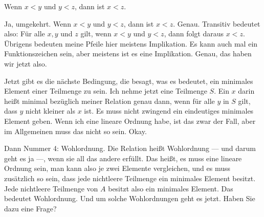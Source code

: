 \begin{student-interaction}[Studentenantwort]
Wenn $x < y$ und $y < z$, dann ist $x < z$.
\end{student-interaction}

\begin{spoken-clean}[continued]
Ja, umgekehrt. Wenn $x < y$ und $y < z$, dann ist $x < z$. Genau. Transitiv bedeutet also: Für alle $x, y$ und $z$ gilt, wenn $x < y$ und $y < z$, dann folgt daraus $x < z$. Übrigens bedeuten meine Pfeile hier meistens Implikation. Es kann auch mal ein Funktionszeichen sein, aber meistens ist es eine Implikation. Genau, das haben wir jetzt also.

Jetzt gibt es die nächste Bedingung, die besagt, was es bedeutet, ein minimales Element einer Teilmenge zu sein. Ich nehme jetzt eine Teilmenge $S$. Ein $x$ darin heißt minimal bezüglich meiner Relation genau dann, wenn für alle $y$ in $S$ gilt, dass $y$ nicht kleiner als $x$ ist. Es muss nicht zwingend ein eindeutiges minimales Element geben. Wenn ich eine lineare Ordnung habe, ist das zwar der Fall, aber im Allgemeinen muss das nicht so sein. Okay.

Dann Nummer 4: Wohlordnung. Die Relation heißt Wohlordnung --- und darum geht es ja ---, wenn sie all das andere erfüllt. Das heißt, es muss eine lineare Ordnung sein, man kann also je zwei Elemente vergleichen, und es muss zusätzlich so sein, dass jede nichtleere Teilmenge ein minimales Element besitzt. Jede nichtleere Teilmenge von $A$ besitzt also ein minimales Element. Das bedeutet Wohlordnung. Und um solche Wohlordnungen geht es jetzt. Haben Sie dazu eine Frage?
\end{spoken-clean}

